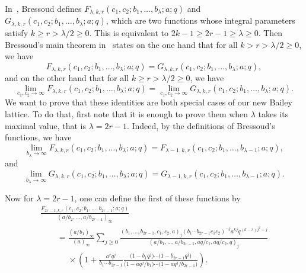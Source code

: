 \documentclass[pdftex]{sigma}
\numberwithin{equation}{section}
\begin{document}
In~\cite{Br80}, Bressoud defines $F_{\lambda,k,r}(c_1,c_2;b_1,\dots,b_\lambda;a;q)$ and $G_{\lambda,k,r}(c_1,c_2;b_1,\dots,b_\lambda;a;q)$, which are two functions whose integral parameters satisfy $k\geq r>\lambda/2\geq0$. This is equivalent to $2k-1\geq2r-1\geq\lambda\geq0$. Then Bressoud's main theorem in~\cite{Br80} states on the one hand that for all $k>r>\lambda/2\geq0$, we have
\begin{equation}\label{eq:bressoud}
F_{\lambda,k,r}(c_1,c_2;b_1,\dots,b_\lambda;a;q)=G_{\lambda,k,r}(c_1,c_2;b_1,\dots,b_\lambda;a;q),
\end{equation}
and on the other hand that for all $k\geq r>\lambda/2\geq0$, we have
\begin{equation}\label{eq:bressoudlim}
\lim_{c_1,c_2\to\infty}F_{\lambda,k,r}(c_1,c_2;b_1,\dots,b_\lambda;a;q)=\lim_{c_1,c_2\to\infty}G_{\lambda,k,r}(c_1,c_2;b_1,\dots,b_\lambda;a;q).
\end{equation}
We want to prove that these identities are both special cases of our new Bailey lattice. To do that, first note that it is enough to prove them when $\lambda$ takes its maximal value, that is $\lambda=2r-1$. Indeed, by the definitions of Bressoud's functions, we have
\begin{equation*}\lim_{b_\lambda\to\infty}F_{\lambda,k,r}(c_1,c_2;b_1,\dots,b_\lambda;a;q)=F_{\lambda-1,k,r}(c_1,c_2;b_1,\dots,b_{\lambda-1};a;q),
\end{equation*}
and
\begin{equation*}\lim_{b_\lambda\to\infty}G_{\lambda,k,r}(c_1,c_2;b_1,\dots,b_\lambda;a;q)=G_{\lambda-1,k,r}(c_1,c_2;b_1,\dots,b_{\lambda-1};a;q).
\end{equation*}

Now for $\lambda=2r-1$, one can define the first of these functions by
\begin{gather}
\frac{F_{2r-1,k,r}(c_1,c_2;b_1,\dots,b_{2r-1};a;q)}{(a/b_2,\dots,a/b_{2r-1})_\infty}\nonumber\\
\qquad=\frac{(a/b_1)_\infty}{(a)_\infty}\sum_{j\geq0}\frac{(b_1,\dots,b_{2r-1},c_1,c_2,a)_j(b_1\cdots b_{2r-1}c_1c_2)^{-j}a^{kj}q^{(k-r)j^2+j}}{(a/b_1,\dots,a/b_{2r-1},aq/c_1,aq/c_2,q)_j}\nonumber\\
\phantom{\qquad=}{}\times\left(1+\frac{a^{r}q^{j}}{b_1\cdots b_{2r-1}}\frac{\bigl(1-b_1q^j\bigr)\cdots\bigl(1-b_{2r-1} q^j\bigr)}{\bigl(1-aq^j/b_1\bigr)\cdots\bigl(1-aq^j/b_{2r-1}\bigr)}\right).\label{FBressoud}
\end{gather}
\end{document}
